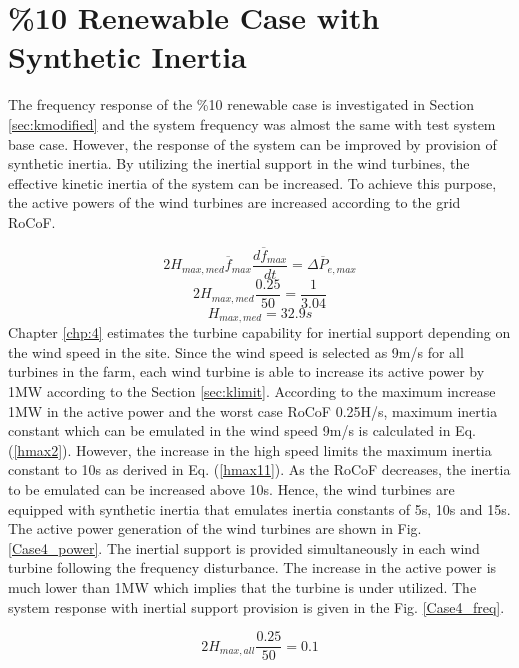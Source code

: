 \section{\%10 Renewable Case with Synthetic Inertia}
The frequency response of the \%10 renewable case is investigated in Section \ref{sec:kmodified} and the system frequency was almost the same with test system base case. However, the response of the system can be improved by provision of synthetic inertia. By utilizing the inertial support in the wind turbines, the effective kinetic inertia of the system can be increased. To achieve this purpose, the active powers of the wind turbines are increased according to the grid RoCoF. \par
\begin{equation}
\label{hmax}
2H_{max,med}\overline{f}_{max}\frac{d\overline{f}_{max}}{dt}=\Delta\overline{P}_{e,max}
\end{equation}
\begin{equation}
\label{hmax1}
2H_{max,med}\frac{0.25}{50}=\frac{1}{3.04}
\end{equation}
\begin{equation}
\label{hmax2}
H_{max,med}=32.9s
\end{equation}
Chapter \ref{chp:4} estimates the turbine capability for inertial support depending on the wind speed in the site. Since the wind speed is selected as 9m/s for all turbines in the farm, each wind turbine is able to increase its active power by 1MW according to the Section \ref{sec:klimit}. According to the maximum increase 1MW in the active power and the worst case RoCoF 0.25H/s, maximum inertia constant which can be emulated in the wind speed 9m/s is calculated in Eq. (\ref{hmax2}). However, the increase in the high speed limits the maximum inertia constant to 10s as derived in Eq. (\ref{hmax11}). As the RoCoF decreases, the inertia to be emulated can be increased above 10s. Hence, the wind turbines are equipped with synthetic inertia that emulates inertia constants of 5s, 10s and 15s. The active power generation of the wind turbines are shown in Fig. \ref{Case4_power}. The inertial support is provided simultaneously in each wind turbine following the frequency disturbance. The increase in the active power is much lower than 1MW which implies that the turbine is under utilized. The system response with inertial support provision is given in the Fig. \ref{Case4_freq}.\par
\begin{equation}
\label{hmax11}
2H_{max,all}\frac{0.25}{50}=0.1
\end{equation}
